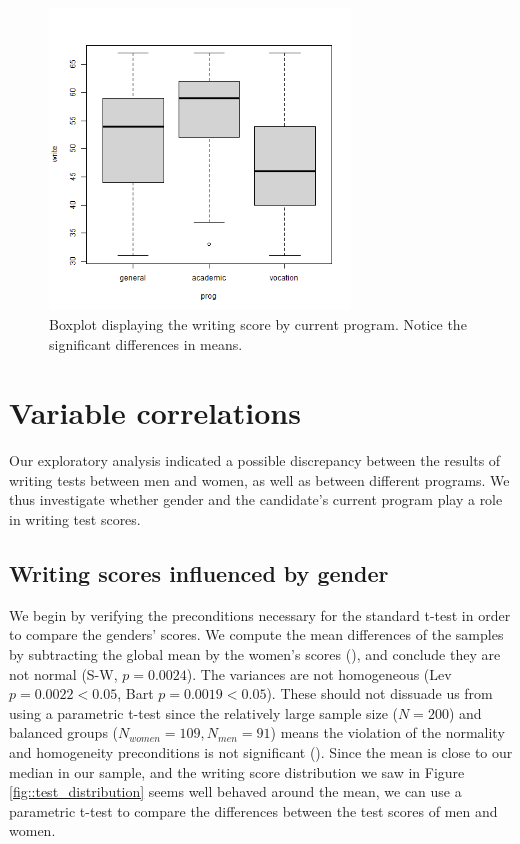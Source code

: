 \documentclass[10pt, a4paper]{article}
\begin{document}
	\begin{figure}
		\includegraphics[width=8cm]{write_prog_boxplot.png}
		\centering
		\caption{Boxplot displaying the writing score by current program. Notice the significant differences in means.}
		\label{fig::write_prog}
	\end{figure}
	
	\section{Variable correlations}
	\label{sec::var_cors}
	
	Our exploratory analysis indicated a possible discrepancy between the results of writing tests between men and women, as well as between different programs. We thus investigate whether gender and the candidate's current program play a role in writing test scores.
	
	\subsection{Writing scores influenced by gender}
	
	We begin by verifying the preconditions necessary for the standard t-test in order to compare the genders' scores. We compute the mean differences of the samples by subtracting the global mean by the women's scores (\textcite{means}), and conclude they are not normal (S-W, $p = 0.0024$). The variances are not homogeneous (Lev $p = 0.0022 < 0.05$, Bart $p = 0.0019 < 0.05$). These should not dissuade us from using a parametric t-test since the relatively large sample size ($N=200$) and balanced groups ($N_{women} = 109, N_{men} = 91$) means the violation of the normality and homogeneity preconditions is not significant (\textcite{variances}). Since the mean is  close to our median in our sample, and the writing score distribution we saw in Figure \ref{fig::test_distribution} seems well behaved around the mean, we can use a parametric t-test to compare the differences between the test scores of men and women. 
	
\end{document}
